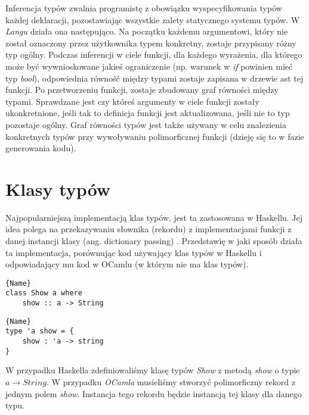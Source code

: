 \documentclass[declaration,shortabstract]{iithesis}
\begin{document}
Inferencja typów zwalnia programistę z obowiązku wyspecyfikowania typów 
każdej deklaracji, pozostawiając wszystkie zalety statycznego systemu typów.
W \textit{Langu} działa ona następująco. Na początku każdemu argumentowi,
który nie został oznaczony przez użytkownika typem konkretny, zostaje 
przypisany różny typ ogólny. Podczas inferencji w ciele funkcji, dla 
każdego wyrażenia, dla którego może być wywnioskowane jakieś ograniczenie 
(np. warunek w \textit{if} powinien mieć typ \textit{bool}), odpowiednia 
równość między typami zostaje zapisana w drzewie ast tej funkcji. Po 
przetworzeniu funkcji, zostaje zbudowany graf równości między typami. 
Sprawdzane jest czy któreś argumenty w ciele funkcji zostały ukonkretnione, 
jeśli tak to definicja funkcji jest aktualizowana, jeśli nie to typ pozostaje
ogólny. Graf równości typów jest także używany w celu znalezienia konkretnych 
typów przy wywoływaniu polimorficznej funkcji (dzieję się to w fazie 
generowania kodu). 

\section{Klasy typów}
Najpopularniejszą implementacją klas typów, jest ta zastosowana w Haskellu. 
Jej idea polega na przekazywaniu słownika (rekordu) z implementacjami funkcji 
z danej instancji klasy (ang. dictionary passing) \cite{type_class_wadler88}. Przedstawię w jaki sposób 
działa ta implementacja, porównując kod używający klas typów w Haskellu i 
odpowiadający mu kod w OCamlu (w którym nie ma klas typów).

\noindent\begin{minipage}{.45\textwidth}
\begin{lstlisting}[caption=Deklaracja klasy typów w Haskellu, frame=tlrb]{Name}
class Show a where 
    show :: a -> String
\end{lstlisting}
\end{minipage}\hfill
\begin{minipage}{.45\textwidth}
\begin{lstlisting}[caption=Deklaracja odpowiednika klasy typów w OCamlu z
użyciem metody przekazywania słownika, frame=tlrb]{Name}
type 'a show = { 
    show : 'a -> string 
} 
\end{lstlisting}
\end{minipage}

W przypadku Haskella zdefiniowaliśmy klasę typów \textit{Show} z metodą 
\textit{show} o typie $a \rightarrow String$. W przypadku \textit
{OCamla} musieliśmy stworzyć polimorficzny rekord z jednym polem \textit{show}.
Instancja tego rekordu będzie instancją tej klasy dla danego typu. 
\end{document}
